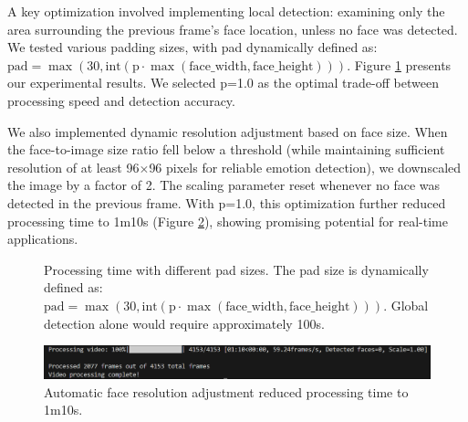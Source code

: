 A key optimization involved implementing local detection: examining only the area surrounding the previous frame's face location, unless no face was detected. We tested various padding sizes, with pad dynamically defined as: $\text{pad} = \max(30, \text{int}(\text{p} \cdot \max(\text{face\_width}, \text{face\_height})))$. Figure \ref{fig:pad_size} presents our experimental results. We selected p=1.0 as the optimal trade-off between processing speed and detection accuracy.

We also implemented dynamic resolution adjustment based on face size. When the face-to-image size ratio fell below a threshold (while maintaining sufficient resolution of at least 96$\times$96 pixels for reliable emotion detection), we downscaled the image by a factor of 2. The scaling parameter reset whenever no face was detected in the previous frame. With p=1.0, this optimization further reduced processing time to 1m10s (Figure \ref{auto_face_command}), showing promising potential for real-time applications.

\begin{figure}[!htb]
\centering
{}
\caption{Processing time with different pad sizes. The pad size is dynamically defined as: $\text{pad} = \max(30, \text{int}(\text{p} \cdot \max(\text{face\_width}, \text{face\_height})))$. Global detection alone would require approximately 100s.}
\label{fig:pad_size}
\end{figure}

\begin{figure}[!htb]
	\centering
	 \includegraphics[width=1.0\linewidth]{sec/assets/auto_face_command.png}
	 \caption{Automatic face resolution adjustment reduced processing time to 1m10s.}
	 \label{auto_face_command}
\end{figure}

